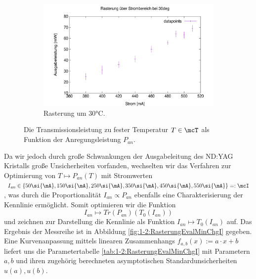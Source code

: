 \documentclass[../../main.tex]{subfiles}
\begin{document}
\begin{figure}
\begin{subfigure}[t]{0.45\textwidth}
            \includegraphics[width=\textwidth]{../../Bilddateien/1-2/Rasterung_30deg.png}
            \caption{Rasterung um $30\si{\celsius}$.}
            \label{fig:1-2:Rasterung30deg}
        \end{subfigure}
        \caption{Die Transmissionsleistung zu fester Temperatur $T\in\mcT$ als Funktion der Anregungsleistung $P_{\textit{an}}$.}
    \end{figure}

    Da wir jedoch durch große Schwankungen der Ausgabeleitung des ND:YAG Kristalls große Unsicherheiten vorfanden, wechselten wir das Verfahren zur Optimierung von $T\mapsto P_{\textit{an}}(T)$ mit Stromwerten $I_{\textit{an}}\in\{50\si{\mA},150\si{\mA},250\si{\mA},350\si{\mA},450\si{\mA},550\si{\mA}\}=:\mcI$, was durch die Proportionalität $I_{\textit{an}}\propto P_{\textit{an}}$ ebenfalls eine Charakterisierung der Kennlinie ermöglicht. Somit optimieren wir die Funktion
    \[
        I_{\textit{an}}\mapsto\textit{Tr}(P_{\textit{an}})(T_0(I_{\textit{an}}))
    \]
    und zeichnen zur Darstellung die Kennlinie als Funktion $I_{\textit{an}}\mapsto T_0(I_{\textit{an}})$ auf. Das Ergebnis der Messreihe ist in Abbildung \ref{fig:1-2:RasterungEvalMinChgI} gegeben. Eine Kurvenanpassung mittels linearen Zusammenhangs $f_{a,b}(x) := a\cdot x + b$ liefert uns die Parametertabelle \ref{tab:1-2:RasterungEvalMinChgI} mit Parametern $a,b$ und ihren zugehörig berechneten asymptotischen Standardunsicherheiten $u(a),u(b)$.
\end{document}
